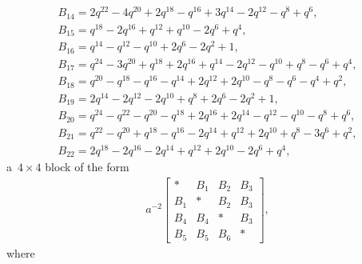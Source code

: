 \documentclass[10pt,a4paper]{amsart}
\numberwithin{equation}{section}
\theoremstyle{definition}
\newcommand{\flac}[2]{#1}
\begin{document}
\begin{gather*}
 B_{14} =
\flac{2q^{22}}{a^2}-\flac{4q^{20}}{a^2}+\flac{2q^{18}}{a^2}-\flac{q^{16}}{a^2}+\flac{3q^{14}}{a^2}-\flac{2q^{12}}{a^2}-\flac{q^{8}}{a^2}+\flac{q^{6}}{a^2}, \\
 B_{15} =
\flac{q^{18}}{a^2}-\flac{2q^{16}}{a^2}+\flac{q^{12}}{a^2}+\flac{q^{10}}{a^2}-\flac{2q^{6}}{a^2}+\flac{q^{4}}{a^2}, \\
 B_{16} =
\flac{q^{14}}{a^2}-\flac{q^{12}}{a^2}-\flac{q^{10}}{a^2}+\flac{2q^{6}}{a^2}-\flac{2q^{2}}{a^2}+\flac{1}{a^2}, \\
 B_{17} =
\flac{q^{24}}{a^2}-\flac{3q^{20}}{a^2}+\flac{q^{18}}{a^2}+\flac{2q^{16}}{a^2}+\flac{q^{14}}{a^2}-\flac{2q^{12}}{a^2}-\flac{q^{10}}{a^2}+\flac{q^{8}}{a^2}-\flac{q^{6}}{a^2}+\flac{q^{4}}{a^2}, \\
 B_{18} =
\flac{q^{20}}{a^2}-\flac{q^{18}}{a^2}-\flac{q^{16}}{a^2}-\flac{q^{14}}{a^2}+\flac{2q^{12}}{a^2}+\flac{2q^{10}}{a^2}-\flac{q^{8}}{a^2}-\flac{q^{6}}{a^2}-\flac{q^{4}}{a^2}+\flac{q^{2}}{a^2}, \\
 B_{19} =
\flac{2q^{14}}{a^2}-\flac{2q^{12}}{a^2}-\flac{2q^{10}}{a^2}+\flac{q^{8}}{a^2}+\flac{2q^{6}}{a^2}-\flac{2q^{2}}{a^2}+\flac{1}{a^2}, \\
 B_{20} =
\flac{q^{24}}{a^2}-\flac{q^{22}}{a^2}-\flac{q^{20}}{a^2}-\flac{q^{18}}{a^2}+\flac{2q^{16}}{a^2}+\flac{2q^{14}}{a^2}-\flac{q^{12}}{a^2}-\flac{q^{10}}{a^2}-\flac{q^{8}}{a^2}+\flac{q^{6}}{a^2}, \\
 B_{21} =
\flac{q^{22}}{a^2}-\flac{q^{20}}{a^2}+\flac{q^{18}}{a^2}-\flac{q^{16}}{a^2}-\flac{2q^{14}}{a^2}+\flac{q^{12}}{a^2}+\flac{2q^{10}}{a^2}+\flac{q^{8}}{a^2}-\flac{3q^{6}}{a^2}+\flac{q^{2}}{a^2}, \\
 B_{22} =
\flac{2q^{18}}{a^2}-\flac{2q^{16}}{a^2}-\flac{2q^{14}}{a^2}+\flac{q^{12}}{a^2}+\flac{2q^{10}}{a^2}-\flac{2q^{6}}{a^2}+\flac{q^{4}}{a^2},
\end{gather*}
a~$4 \times 4$ block of the form
\begin{align*}
 a^{-2} \begin{bmatrix}
 * & B_1 & B_2 & B_3 \\
 B_1 & * & B_2 & B_3 \\
 B_4 & B_4 & * & B_3 \\
 B_5 & B_5 & B_6 & *
 \end{bmatrix},
\end{align*}
where
\end{document}

